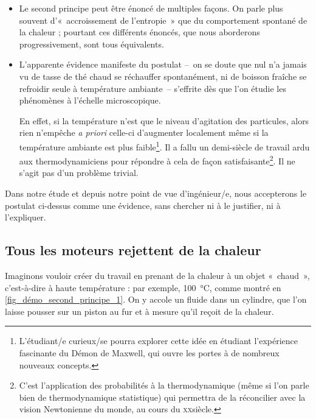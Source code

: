 		\begin{itemize}
			\item Le second principe peut être énoncé de multiples façons. On parle plus souvent d’«~accroissement de l’entropie~» que du comportement spontané de la chaleur ; pourtant ces différents énoncés, que nous aborderons progressivement, sont tous équivalents.
			\item L’apparente évidence manifeste du postulat --\ on se doute que nul n’a jamais vu de tasse de thé chaud se réchauffer spontanément, ni de boisson fraîche se refroidir seule à température ambiante\ -- s’effrite dès que l’on étudie les phénomènes à l’échelle microscopique. 

		En effet, si la température n’est que le niveau d’agitation des particules, alors rien n’empêche \textit{a priori} celle-ci d’augmenter localement même si la température ambiante est plus faible\footnote{L’étudiant/e curieux/se pourra explorer cette idée en étudiant l’expérience fascinante du Démon de Maxwell, qui ouvre les portes à de nombreux nouveaux concepts.}. Il a fallu un demi-siècle de travail ardu aux thermodynamiciens pour répondre à cela de façon satisfaisante\footnote{C’est l’application des probabilités à la thermodynamique (même si l’on parle bien de thermodynamique statistique) qui permettra de la réconcilier avec la vision Newtonienne du monde, au cours du \textsc{xx}\ieme siècle.}. Il ne s’agit pas d’un problème trivial.
		\end{itemize}

		Dans notre étude et depuis notre point de vue d’ingénieur/e, nous accepterons le postulat ci-dessus comme une évidence, sans chercher ni à le justifier, ni à l’expliquer.

		 
	\subsection{Tous les moteurs rejettent de la chaleur}
	\label{ch_démo_second_principe}

		Imaginons vouloir créer du travail en prenant de la chaleur à un objet «~chaud~», c’est-à-dire à haute température : par exemple, \SI{100}{\degreeCelsius}, comme montré en \cref{fig_démo_second_principe_1}. On y accole un fluide dans un cylindre, que l’on laisse pousser sur un piston au fur et à mesure qu’il reçoit de la chaleur.

